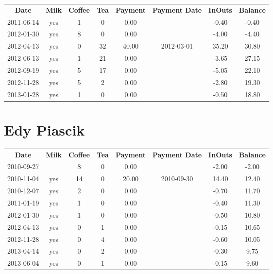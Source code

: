 \begin{center}
\begin{tabular}{cccccccc}
\textbf{Date} & \textbf{Milk} & \textbf{Coffee} & \textbf{Tea} & \textbf{Payment} & \textbf{Payment Date} & \textbf{InOuts} & \textbf{Balance} \\
2011-06-14 & yes & 1 &  0 &  0.00 &  & -0.40 & -0.40\\ 
2012-01-30 & yes & 8 &  0 &  0.00 &  & -4.00 & -4.40\\ 
2012-04-13 & yes & 0 & 32 & 40.00 & 2012-03-01 & 35.20 & 30.80\\ 
2012-06-13 & yes & 1 & 21 &  0.00 &  & -3.65 & 27.15\\ 
2012-09-19 & yes & 5 & 17 &  0.00 &  & -5.05 & 22.10\\ 
2012-11-28 & yes & 5 &  2 &  0.00 &  & -2.80 & 19.30\\ 
2013-01-28 & yes & 1 &  0 &  0.00 &  & -0.50 & 18.80
\end{tabular}
\end{center}

\section{Edy Piascik}

\begin{center}
\begin{tabular}{cccccccc}
\textbf{Date} & \textbf{Milk} & \textbf{Coffee} & \textbf{Tea} & \textbf{Payment} & \textbf{Payment Date} & \textbf{InOuts} & \textbf{Balance} \\
2010-09-27 &  &  8 & 0 &  0.00 &  & -2.00 & -2.00\\ 
2010-11-04 & yes & 14 & 0 & 20.00 & 2010-09-30 & 14.40 & 12.40\\ 
2010-12-07 & yes &  2 & 0 &  0.00 &  & -0.70 & 11.70\\ 
2011-01-19 & yes &  1 & 0 &  0.00 &  & -0.40 & 11.30\\ 
2012-01-30 & yes &  1 & 0 &  0.00 &  & -0.50 & 10.80\\ 
2012-04-13 & yes &  0 & 1 &  0.00 &  & -0.15 & 10.65\\ 
2012-11-28 & yes &  0 & 4 &  0.00 &  & -0.60 & 10.05\\ 
2013-04-14 & yes &  0 & 2 &  0.00 &  & -0.30 &  9.75\\ 
2013-06-04 & yes &  0 & 1 &  0.00 &  & -0.15 &  9.60
\end{tabular}
\end{center}

